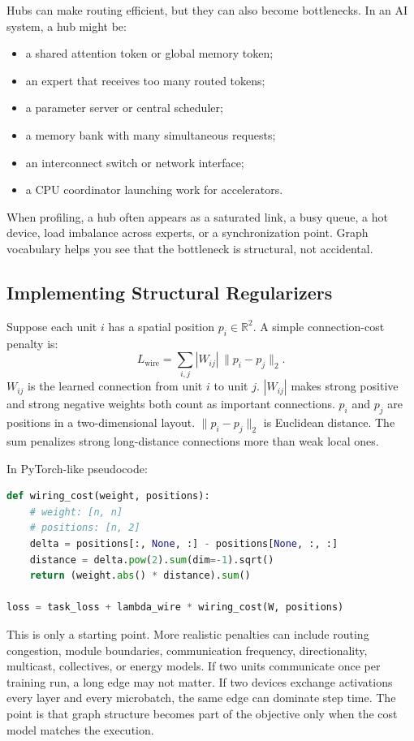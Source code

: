 Hubs can make routing efficient, but they can also become bottlenecks. In an AI system, a hub might be:

\begin{itemize}[leftmargin=*]
  \item a shared attention token or global memory token;
  \item an expert that receives too many routed tokens;
  \item a parameter server or central scheduler;
  \item a memory bank with many simultaneous requests;
  \item an interconnect switch or network interface;
  \item a CPU coordinator launching work for accelerators.
\end{itemize}

When profiling, a hub often appears as a saturated link, a busy queue, a hot device, load imbalance across experts, or a synchronization point. Graph vocabulary helps you see that the bottleneck is structural, not accidental.

\subsection{Implementing Structural Regularizers}

Suppose each unit \(i\) has a spatial position \(p_i \in \mathbb{R}^2\). A simple connection-cost penalty is:
\[
  L_{\text{wire}} =
  \sum_{i,j} |W_{ij}| \, \|p_i - p_j\|_2.
\]
\(W_{ij}\) is the learned connection from unit \(i\) to unit \(j\). \(|W_{ij}|\) makes strong positive and strong negative weights both count as important connections. \(p_i\) and \(p_j\) are positions in a two-dimensional layout. \(\|p_i-p_j\|_2\) is Euclidean distance. The sum penalizes strong long-distance connections more than weak local ones.

In PyTorch-like pseudocode:

\begin{lstlisting}[language=Python, caption={A schematic wiring-cost regularizer.}]
def wiring_cost(weight, positions):
    # weight: [n, n]
    # positions: [n, 2]
    delta = positions[:, None, :] - positions[None, :, :]
    distance = delta.pow(2).sum(dim=-1).sqrt()
    return (weight.abs() * distance).sum()

loss = task_loss + lambda_wire * wiring_cost(W, positions)
\end{lstlisting}

This is only a starting point. More realistic penalties can include routing congestion, module boundaries, communication frequency, directionality, multicast, collectives, or energy models. If two units communicate once per training run, a long edge may not matter. If two devices exchange activations every layer and every microbatch, the same edge can dominate step time. The point is that graph structure becomes part of the objective only when the cost model matches the execution.

